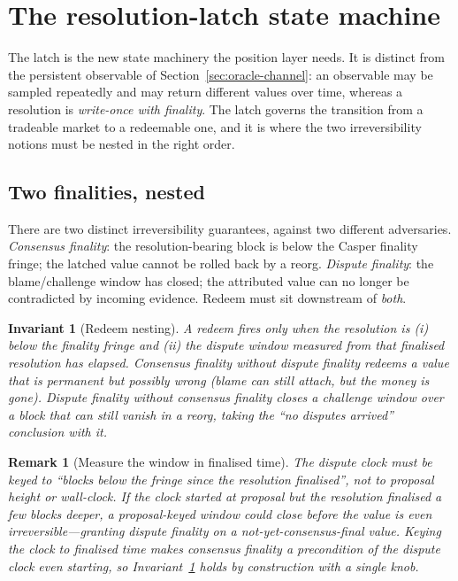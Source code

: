\documentclass[11pt]{article}
\newtheorem{remark}{Remark}[section]
\newtheorem{invariant}{Invariant}[section]
\begin{document}
\section{The resolution-latch state machine}\label{sec:latch}

The latch is the new state machinery the position layer needs. It is distinct from the
persistent observable of Section~\ref{sec:oracle-channel}: an observable may be sampled
repeatedly and may return different values over time, whereas a resolution is \emph{write-once
with finality}. The latch governs the transition from a tradeable market to a redeemable one,
and it is where the two irreversibility notions must be nested in the right order.

\subsection{Two finalities, nested}

There are two distinct irreversibility guarantees, against two different adversaries.
\emph{Consensus finality}: the resolution-bearing block is below the Casper finality fringe;
the latched value cannot be rolled back by a reorg. \emph{Dispute finality}: the blame/challenge
window has closed; the attributed value can no longer be contradicted by incoming evidence.
Redeem must sit downstream of \emph{both}.

\begin{invariant}[Redeem nesting]\label{inv:nest}
A redeem fires only when the resolution is (i) below the finality fringe \emph{and} (ii) the
dispute window measured from that finalised resolution has elapsed. Consensus finality without
dispute finality redeems a value that is permanent but possibly wrong (blame can still attach,
but the money is gone). Dispute finality without consensus finality closes a challenge window
over a block that can still vanish in a reorg, taking the ``no disputes arrived'' conclusion
with it.
\end{invariant}

\begin{remark}[Measure the window in finalised time]
The dispute clock must be keyed to ``blocks below the fringe since the resolution finalised'',
not to proposal height or wall-clock. If the clock started at proposal but the resolution
finalised a few blocks deeper, a proposal-keyed window could close before the value is even
irreversible---granting dispute finality on a not-yet-consensus-final value. Keying the clock to
finalised time makes consensus finality a precondition of the dispute clock even starting, so
Invariant~\ref{inv:nest} holds by construction with a single knob.
\end{remark}
\end{document}
